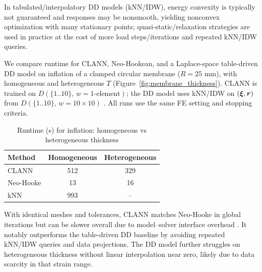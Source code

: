   In tabulated/interpolatory DD models (kNN/IDW), energy convexity is typically not guaranteed and responses may be nonsmooth, yielding nonconvex optimization with many stationary points; quasi-static/relaxation strategies are used in practice \cite{KirchdoerferOrtiz2016,KirchdoerferOrtiz2017} at the cost of more load steps/iterations and repeated kNN/IDW queries.

  We compare runtime for CLANN, Neo-Hookean, and a Laplace-space table-driven DD model \cite{xi2023} on inflation of a clamped circular membrane ($R{=}25$ mm), with homogeneous and heterogeneous $T$ (Figure~\ref{fig:membrane_thickness}). CLANN is trained on $D(\{1..10\},\,w{=}\text{1-element})$; the DD model uses kNN/IDW on $(\boldsymbol{\xi},\boldsymbol{r})$ from $D(\{1..10\},\,w{=}10\times10)$ \cite{xi2023}. All runs use the same FE setting and stopping criteria.

\begin{table}[htbp]
\centering
\caption{Runtime (s) for inflation: homogeneous vs heterogeneous thickness}
\label{tab:experiments_summary}
\begin{tabular}{|l|c|c|}
\hline
\textbf{Method} & \textbf{Homogeneous} & \textbf{Heterogeneous} \\
\hline
CLANN & 512 & 329  \\
\hline
Neo-Hooke & 13 & 16\\
\hline
kNN & 993 & -- \\
\hline
\end{tabular}
\end{table}

  With identical meshes and tolerances, CLANN matches Neo-Hooke in global iterations but can be slower overall due to model–solver interface overhead \cite{xi2023}. It notably outperforms the table-driven DD baseline by avoiding repeated kNN/IDW queries and data projections. The DD model further struggles on heterogeneous thickness without linear interpolation near zero, likely due to data scarcity in that strain range.


